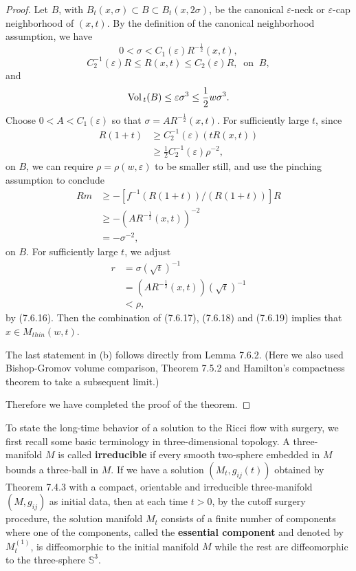 \begin{proof}
Let $B$, with $B_t(x,\sigma)\subset B \subset B_t(x,2\sigma)$, be
the canonical $\varepsilon$-neck or $\varepsilon$-cap neighborhood
of $(x,t)$. By the definition of the canonical neighborhood
assumption, we have
$$
0 < \sigma < C_1(\varepsilon)R^{-\frac{1}{2}}(x,t),
$$
$$
C^{-1}_2(\varepsilon)R \leq  R(x,t) \leq C_2(\varepsilon)R, \
\mbox{ on } \ B,
$$
and \begin{equation} \Vol_t(B) \leq \varepsilon \sigma^3 \leq
\frac{1}{2}w \sigma^3. %
\end{equation} Choose $0 < A < C_1(\varepsilon)$ so that $\sigma =
AR^{-\frac{1}{2}}(x,t)$. For sufficiently large $t$, since
\begin{align*}
R(1+t) &  \geq C^{-1}_2(\varepsilon)(tR(x,t))\\
&  \geq \frac{1}{2}C^{-1}_2(\varepsilon)\rho^{-2},
\end{align*}
on $B$, we can require $\rho=\rho(w,\varepsilon)$ to be smaller
still, and use the pinching assumption to conclude
\begin{align}
Rm&  \geq-[f^{-1}(R(1+t))/(R(1+t))]R\\
&  \geq -(AR^{-\frac{1}{2}}(x,t))^{-2} \nonumber\\
&  = -\sigma^{-2}, \nonumber
\end{align} %
on $B$. For sufficiently large $t$, we adjust
\begin{align}
r&  = \sigma (\sqrt{t})^{-1}\\
&  = (AR^{-\frac{1}{2}}(x,t))(\sqrt{t})^{-1} \nonumber\\
&  < \rho, \nonumber
\end{align} %
by (7.6.16). Then the combination of (7.6.17), (7.6.18) and
(7.6.19) implies that $ x\in M_{thin}(w,t).$

The last statement in (b) follows directly from Lemma 7.6.2. (Here
we also used Bishop-Gromov volume comparison, Theorem 7.5.2 and
Hamilton's compactness theorem to take a subsequent limit.)

Therefore we have completed the proof of the theorem.
\end{proof}

To state the long-time behavior of a solution to the Ricci flow
with surgery, we first recall some basic terminology in
three-dimensional topology. A three-manifold $M$ is called
\textbf{irreducible} if every smooth two-sphere
embedded in $M$ bounds a three-ball in $M$. If we have a solution
$(M_t,g_{ij}(t))$ obtained by Theorem 7.4.3 with a compact,
orientable and irreducible three-manifold $(M,g_{ij})$ as initial
data, then at each time $t>0$, by the cutoff surgery procedure,
the solution manifold $M_t$ consists of a finite number of
components where one of the components, called the
\textbf{essential component}  and
denoted by $M_t^{(1)}$, is diffeomorphic to the initial manifold
$M$ while the rest are diffeomorphic to the three-sphere
$\mathbb{S}^3$.

